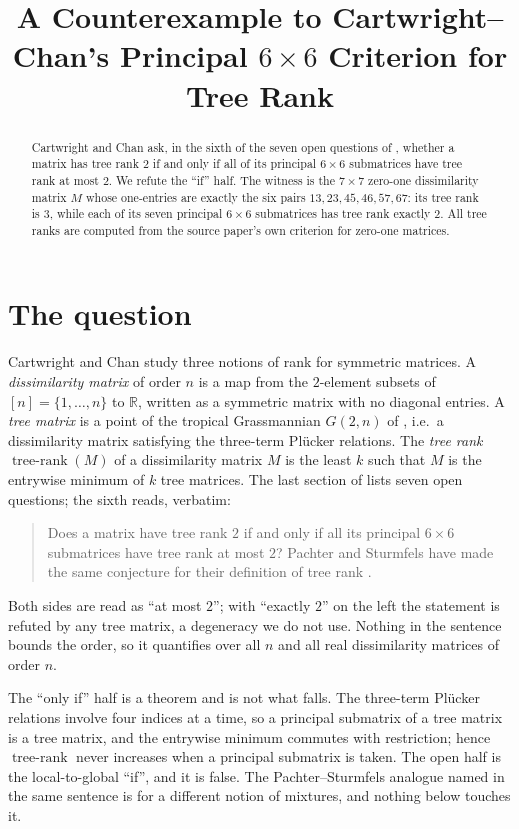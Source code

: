 \documentclass[11pt]{amsart}
\title[A counterexample to a principal $6\times6$ criterion for tree rank]
{A Counterexample to Cartwright--Chan's Principal $6\times6$ Criterion for Tree Rank}
\date{}
\theoremstyle{remark}
\DeclareMathOperator{\trank}{tree\text{-}rank}
\begin{document}
\begin{abstract}
Cartwright and Chan ask, in the sixth of the seven open questions of \cite{CC}, whether a matrix
has tree rank $2$ if and only if all of its principal $6\times6$ submatrices have tree rank at
most $2$. We refute the ``if'' half. The witness is the $7\times7$ zero-one dissimilarity matrix
$M$ whose one-entries are exactly the six pairs $13,23,45,46,57,67$: its tree rank is $3$, while
each of its seven principal $6\times6$ submatrices has tree rank exactly $2$. All tree ranks are
computed from the source paper's own criterion for zero-one matrices.
\end{abstract}

\maketitle

\section{The question}

Cartwright and Chan \cite{CC} study three notions of rank for symmetric matrices. A
\emph{dissimilarity matrix} of order $n$ is a map from the $2$-element subsets of
$[n]=\{1,\dots,n\}$ to $\mathbb R$, written as a symmetric matrix with no diagonal entries. A
\emph{tree matrix} is a point of the tropical Grassmannian $G(2,n)$ of \cite{SS}, i.e.\ a
dissimilarity matrix satisfying the three-term Pl\"ucker relations. The \emph{tree rank}
$\trank(M)$ of a dissimilarity matrix $M$ is the least $k$ such that $M$ is the entrywise
minimum of $k$ tree matrices. The last section of \cite{CC} lists seven open questions; the
sixth reads, verbatim:

\begin{quote}
Does a matrix have tree rank $2$ if and only if all its principal $6\times6$ submatrices have
tree rank at most $2$? Pachter and Sturmfels have made the same conjecture for their definition
of tree rank \cite[p.~124]{PS}.
\end{quote}

Both sides are read as ``at most $2$''; with ``exactly $2$'' on the left the statement is
refuted by any tree matrix, a degeneracy we do not use. Nothing in the sentence bounds the
order, so it quantifies over all $n$ and all real dissimilarity matrices of order $n$.

The ``only if'' half is a theorem and is not what falls. The three-term Pl\"ucker relations
involve four indices at a time, so a principal submatrix of a tree matrix is a tree matrix, and
the entrywise minimum commutes with restriction; hence $\trank$ never increases when a principal
submatrix is taken. The open half is the local-to-global ``if'', and it is false. The
Pachter--Sturmfels analogue named in the same sentence is for a different notion of mixtures, and
nothing below touches it.
\end{document}
